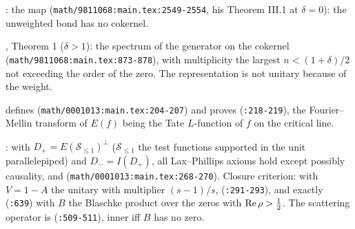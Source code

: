 \begin{citedfact}[Connes: $E$ is a surjective isometry at $\delta = 0$]
\label{cit:connes-surjective-isometry}
\cite{connes1998trace}: the map \texttt{}
\texttt{} (\texttt{math/9811068:main.tex:2549-2554},
his Theorem III.1 at $\delta = 0$): the unweighted bond has no cokernel.
\end{citedfact}

\begin{citedfact}
\label{cit:connes-cokernel-critical}
\cite{connes1998trace}, Theorem 1 ($\delta>1$): the spectrum of the generator on the cokernel
\texttt{}
(\texttt{math/9811068:main.tex:873-878}), with multiplicity the largest $n<(1+\delta)/2$ not exceeding the order of
the zero. The representation is not unitary because of the weight.
\end{citedfact}

\begin{citedfact}
\label{cit:burnol-E-dense}
\cite{burnol2001causality} defines
\texttt{}
(\texttt{math/0001013:main.tex:204-207}) and proves
\texttt{} (\texttt{:218-219}), the
Fourier--Mellin transform of $E(f)$ being the Tate $L$-function of $f$ on the critical line.
\end{citedfact}

\begin{citedfact}
\label{cit:burnol-causality}
\cite{burnol2001causality}: with $D_+ = E(\mathcal S_{\le1})^\perp$ ($\mathcal S_{\le1}$ the test functions supported in
the unit parallelepiped) and $D_- = I(D_+)$, all Lax--Phillips axioms hold except possibly causality, and
\texttt{}
(\texttt{math/0001013:main.tex:268-270}). Closure criterion: with $V = 1 - A$ the unitary with multiplier
$(s-1)/s$, \texttt{}
(\texttt{:291-293}), and exactly \texttt{} (\texttt{:639}) with $B$ the Blaschke
product over the zeros with $\operatorname{Re}\rho>\tfrac12$. The scattering operator is
\texttt{} (\texttt{:509-511}), inner iff $B$ has no zero.
\end{citedfact}

